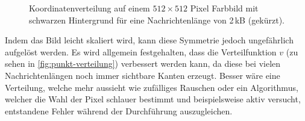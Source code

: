 \begin{figure}[h!]
  \centering
  \caption{Koordinatenverteilung auf einem $512 \times 512$ Pixel Farbbild mit
    schwarzen Hintergrund für eine Nachrichtenlänge von 2\,kB (gekürzt).}
  \label{fig:example-white-stripes}
\end{figure}

\noindent
Indem das Bild leicht skaliert wird, kann diese Symmetrie jedoch ungefährlich aufgelöst
werden. Es wird allgemein festgehalten, dass die Verteilfunktion $v$
(zu sehen in \autoref{fig:punkt-verteilung})
verbessert werden kann, da diese bei vielen Nachrichtenlängen noch immer
sichtbare Kanten erzeugt. Besser wäre eine Verteilung, welche mehr aussieht wie
zufälliges Rauschen oder ein Algorithmus, welcher die Wahl der Pixel schlauer
bestimmt und beispielsweise aktiv versucht, entstandene Fehler während
der Durchführung auszugleichen.
